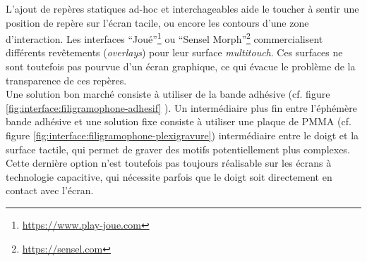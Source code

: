 \noindent L'ajout de repères statiques ad-hoc et interchageables aide le toucher à sentir une position de repère sur l'écran tacile, ou encore les contours d'une zone d'interaction. Les interfaces ``Joué''\footnote{\url{https://www.play-joue.com}} ou ``Sensel Morph''\footnote{\url{https://sensel.com}} commercialisent différents revêtements (\textit{overlays}) pour leur surface \textit{multitouch}. Ces surfaces ne sont toutefois pas pourvue d'un écran graphique, ce qui évacue le problème de la transparence de ces repères.\\
Une solution bon marché consiste à utiliser de la bande adhésive (cf. figure \ref{fig:interface:filigramophone-adhesif}
). Un intermédiaire plus fin entre l'éphémère bande adhésive et une solution fixe consiste à utiliser une plaque de \gls{PMMA} (cf. figure \ref{fig:interface:filigramophone-plexigravure}) intermédiaire entre le doigt et la surface tactile, qui permet de graver des motifs potentiellement plus complexes. Cette dernière option n'est toutefois pas toujours réalisable sur les écrans à technologie capacitive, qui nécessite parfois que le doigt soit directement en contact avec l'écran.\\

